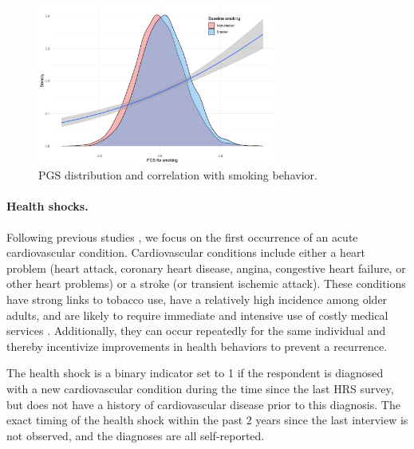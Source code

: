 \documentclass[11pt]{article}
\begin{document}
\begin{figure}[!ht]
	\begin{center}
	\includegraphics[width=0.7\textwidth]{../3_output/make_histograms/pgs_density_6070_smoken_smooth.png}
	\caption{PGS distribution and correlation with smoking behavior.
	\label{fig:PGS}}
	\vspace{-0.8cm}
	\end{center}
\end{figure}

\paragraph{Health shocks.} Following previous studies \citep{Falba2005,Keenan2009,Khwaja2006spouse,Khwaja2006learn,Smith2001}, we focus on the first occurrence of an acute cardiovascular condition.
Cardiovascular conditions include either a heart problem (heart attack, coronary heart disease, angina, congestive heart failure, or other heart problems) or a stroke (or transient ischemic attack).
These conditions have strong links to tobacco use, have a relatively high incidence among older adults, and are likely to require immediate and intensive use of costly medical services \citep{Thorpe2004,Teo2006,Lloyd-Jones2010}.
Additionally, they can occur repeatedly for the same individual and thereby incentivize improvements in health behaviors to prevent a recurrence.

The health shock is a binary indicator set to 1 if the respondent is diagnosed with a new cardiovascular condition during the time since the last HRS survey, but does not have a history of cardiovascular disease prior to this diagnosis.
The exact timing of the health shock within the past 2 years since the last interview is not observed, and the diagnoses are all self-reported.
\end{document}
